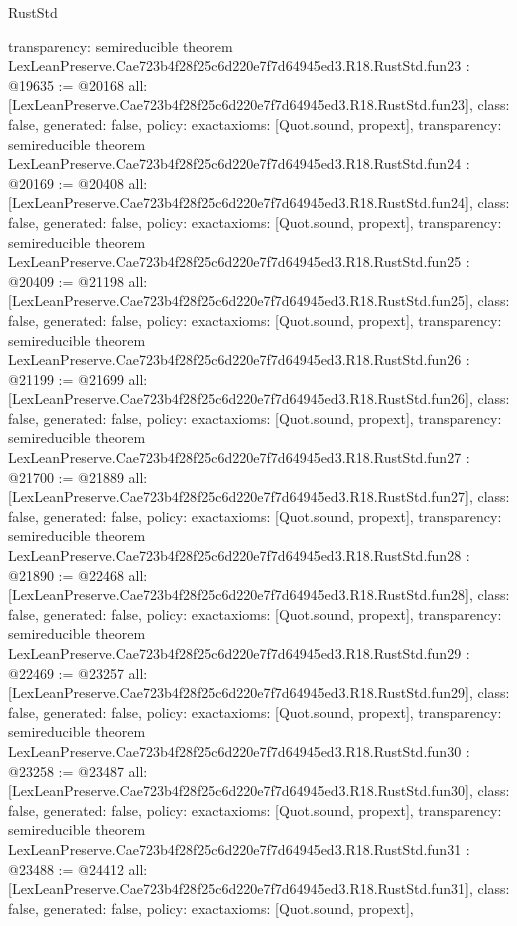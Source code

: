 \begin{lexlean}{RustStd}
\begin{coremodule}
{  transparency: semireducible
}
theorem LexLeanPreserve.Cae723b4f28f25c6d220e7f7d64945ed3.R18.RustStd.fun23 : @19635 := @20168 {
  all: [LexLeanPreserve.Cae723b4f28f25c6d220e7f7d64945ed3.R18.RustStd.fun23],
  class: false,
  generated: false,
  policy: exact{axioms: [Quot.sound, propext]},
  transparency: semireducible
}
theorem LexLeanPreserve.Cae723b4f28f25c6d220e7f7d64945ed3.R18.RustStd.fun24 : @20169 := @20408 {
  all: [LexLeanPreserve.Cae723b4f28f25c6d220e7f7d64945ed3.R18.RustStd.fun24],
  class: false,
  generated: false,
  policy: exact{axioms: [Quot.sound, propext]},
  transparency: semireducible
}
theorem LexLeanPreserve.Cae723b4f28f25c6d220e7f7d64945ed3.R18.RustStd.fun25 : @20409 := @21198 {
  all: [LexLeanPreserve.Cae723b4f28f25c6d220e7f7d64945ed3.R18.RustStd.fun25],
  class: false,
  generated: false,
  policy: exact{axioms: [Quot.sound, propext]},
  transparency: semireducible
}
theorem LexLeanPreserve.Cae723b4f28f25c6d220e7f7d64945ed3.R18.RustStd.fun26 : @21199 := @21699 {
  all: [LexLeanPreserve.Cae723b4f28f25c6d220e7f7d64945ed3.R18.RustStd.fun26],
  class: false,
  generated: false,
  policy: exact{axioms: [Quot.sound, propext]},
  transparency: semireducible
}
theorem LexLeanPreserve.Cae723b4f28f25c6d220e7f7d64945ed3.R18.RustStd.fun27 : @21700 := @21889 {
  all: [LexLeanPreserve.Cae723b4f28f25c6d220e7f7d64945ed3.R18.RustStd.fun27],
  class: false,
  generated: false,
  policy: exact{axioms: [Quot.sound, propext]},
  transparency: semireducible
}
theorem LexLeanPreserve.Cae723b4f28f25c6d220e7f7d64945ed3.R18.RustStd.fun28 : @21890 := @22468 {
  all: [LexLeanPreserve.Cae723b4f28f25c6d220e7f7d64945ed3.R18.RustStd.fun28],
  class: false,
  generated: false,
  policy: exact{axioms: [Quot.sound, propext]},
  transparency: semireducible
}
theorem LexLeanPreserve.Cae723b4f28f25c6d220e7f7d64945ed3.R18.RustStd.fun29 : @22469 := @23257 {
  all: [LexLeanPreserve.Cae723b4f28f25c6d220e7f7d64945ed3.R18.RustStd.fun29],
  class: false,
  generated: false,
  policy: exact{axioms: [Quot.sound, propext]},
  transparency: semireducible
}
theorem LexLeanPreserve.Cae723b4f28f25c6d220e7f7d64945ed3.R18.RustStd.fun30 : @23258 := @23487 {
  all: [LexLeanPreserve.Cae723b4f28f25c6d220e7f7d64945ed3.R18.RustStd.fun30],
  class: false,
  generated: false,
  policy: exact{axioms: [Quot.sound, propext]},
  transparency: semireducible
}
theorem LexLeanPreserve.Cae723b4f28f25c6d220e7f7d64945ed3.R18.RustStd.fun31 : @23488 := @24412 {
  all: [LexLeanPreserve.Cae723b4f28f25c6d220e7f7d64945ed3.R18.RustStd.fun31],
  class: false,
  generated: false,
  policy: exact{axioms: [Quot.sound, propext]},
}
\end{coremodule}
\end{lexlean}
